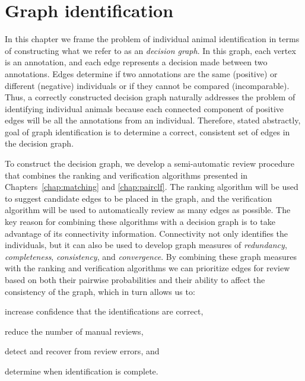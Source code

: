 \chapter{Graph identification}\label{chap:graphid}
\newcommand{\nT}{N}

In this chapter we frame the problem of individual animal identification in
  terms of constructing what we refer to as an \emph{decision graph}.
In this graph, each vertex is an annotation, and each edge represents a
  decision made between two annotations.
Edges determine if two annotations are the same (positive) or different
  (negative) individuals or if they cannot be compared (incomparable).
Thus, a correctly constructed decision graph naturally addresses the problem
  of identifying individual animals because each connected component of positive
  edges will be all the annotations from an individual.
Therefore, stated abstractly, goal of graph identification is to determine a
  correct, consistent set of edges in the decision graph.

To construct the decision graph, we develop a semi-automatic review procedure
  that combines the ranking and verification algorithms presented in
  Chapters~\ref{chap:matching} and \ref{chap:pairclf}.
The ranking algorithm will be used to suggest candidate edges to be placed in
  the graph, and the verification algorithm will be used to automatically review
  as many edges as possible.
The key reason for combining these algorithms with a decision graph is to take
  advantage of its connectivity information.
Connectivity not only identifies the individuals, but it can also be used to
  develop graph measures of \emph{redundancy}, \emph{completeness}, \emph{consistency}, and \emph{convergence}.
By combining these graph measures with the ranking and verification algorithms
  we can prioritize edges for review based on both their pairwise probabilities
  and their ability to affect the consistency of the graph, which in turn allows
  us to:
  \begin{enumin}
    \item increase confidence that the identifications are correct, %
    \item reduce the number of manual reviews,  %
    \item detect and recover from review errors, and %
    \item determine when identification is complete. %
  \end{enumin}

